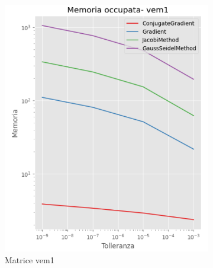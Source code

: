 \begin{figure}[!ht]
\begin{subfigure}{0.45\textwidth}
        \includegraphics[width=\textwidth]{./../report/Progetto_1_bis/img/mem_vem1.png}
        \caption{Matrice vem1}
        \label{fig:mem_vem1}
    \end{subfigure}
    \begin{subfigure}{0.45\textwidth}
        \centering

\end{subfigure}
\end{figure}
